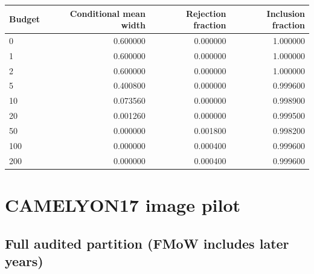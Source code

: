 \begingroup\small
\setlength{\tabcolsep}{4pt}
\begin{longtable}{lrrr}
\toprule

Budget & Conditional mean width & Rejection fraction & Inclusion fraction\\\midrule\endhead

0 & 0.600000 & 0.000000 & 1.000000\\

1 & 0.600000 & 0.000000 & 1.000000\\

2 & 0.600000 & 0.000000 & 1.000000\\

5 & 0.400800 & 0.000000 & 0.999600\\

10 & 0.073560 & 0.000000 & 0.998900\\

20 & 0.001260 & 0.000000 & 0.999500\\

50 & 0.000000 & 0.001800 & 0.998200\\

100 & 0.000000 & 0.000400 & 0.999600\\

200 & 0.000000 & 0.000400 & 0.999600\\

\bottomrule
\end{longtable}
\endgroup

\reservetable
\section{CAMELYON17 image pilot}

\reservetable
\subsection{Full audited partition (FMoW includes later years)}

